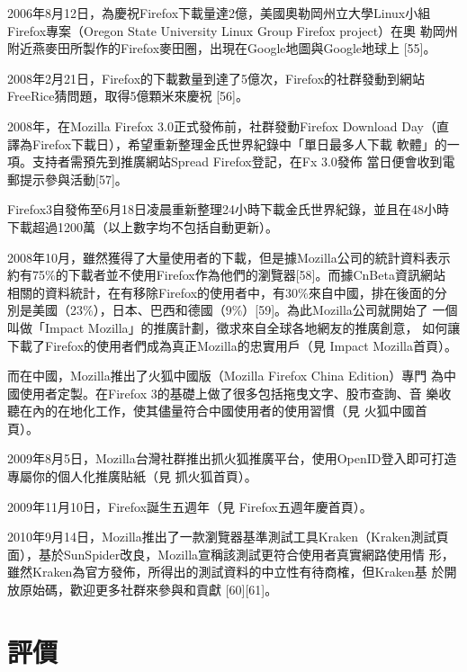 \documentclass[12pt, a4paper, twoside]{article}
\begin{document}


2006年8月12日，為慶祝Firefox下載量達2億，美國奧勒岡州立大學Linux小組
Firefox專案（Oregon State University Linux Group Firefox project）在奧
勒岡州附近燕麥田所製作的Firefox麥田圈，出現在Google地圖與Google地球上
[55]。

2008年2月21日，Firefox的下載數量到達了5億次，Firefox的社群發動到網站
FreeRice猜問題，取得5億顆米來慶祝 [56]。

2008年，在Mozilla Firefox 3.0正式發佈前，社群發動Firefox Download
Day（直譯為Firefox下載日），希望重新整理金氏世界紀錄中「單日最多人下載
  軟體」的一項。支持者需預先到推廣網站Spread Firefox登記，在Fx 3.0發佈
當日便會收到電郵提示參與活動[57]。

Firefox3自發佈至6月18日凌晨重新整理24小時下載金氏世界紀錄，並且在48小時
下載超過1200萬（以上數字均不包括自動更新）。

2008年10月，雖然獲得了大量使用者的下載，但是據Mozilla公司的統計資料表示
約有75\%的下載者並不使用Firefox作為他們的瀏覽器[58]。而據CnBeta資訊網站
相關的資料統計，在有移除Firefox的使用者中，有30\%來自中國，排在後面的分
別是美國（23\%），日本、巴西和德國（9\%）[59]。為此Mozilla公司就開始了
一個叫做「Impact Mozilla」的推廣計劃，徵求來自全球各地網友的推廣創意，
如何讓下載了Firefox的使用者們成為真正Mozilla的忠實用戶（見 Impact
  Mozilla首頁）。

而在中國，Mozilla推出了火狐中國版（Mozilla Firefox China Edition）專門
為中國使用者定製。在Firefox 3的基礎上做了很多包括拖曳文字、股市查詢、音
樂收聽在內的在地化工作，使其儘量符合中國使用者的使用習慣（見 火狐中國首
  頁）。

2009年8月5日，Mozilla台灣社群推出抓火狐推廣平台，使用OpenID登入即可打造
專屬你的個人化推廣貼紙（見 抓火狐首頁）。

2009年11月10日，Firefox誕生五週年（見 Firefox五週年慶首頁）。

2010年9月14日，Mozilla推出了一款瀏覽器基準測試工具Kraken（Kraken測試頁
  面），基於SunSpider改良，Mozilla宣稱該測試更符合使用者真實網路使用情
形，雖然Kraken為官方發佈，所得出的測試資料的中立性有待商榷，但Kraken基
於開放原始碼，歡迎更多社群來參與和貢獻 [60][61]。

\section{評價}
\end{document}

